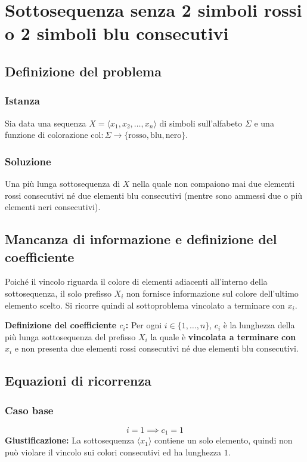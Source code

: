\chapter{Sottosequenza senza 2 simboli rossi o 2 simboli blu consecutivi}

\section{Definizione del problema}

\subsection{Istanza}
Sia data una sequenza $X = \langle x_1, x_2, \dots, x_n \rangle$ di simboli sull'alfabeto $\Sigma$ e una funzione di colorazione $\text{col} : \Sigma \to \{\text{rosso}, \text{blu}, \text{nero}\}$.

\subsection{Soluzione}
Una più lunga sottosequenza di $X$ nella quale non compaiono mai due elementi rossi consecutivi né due elementi blu consecutivi (mentre sono ammessi due o più elementi neri consecutivi).

\section{Mancanza di informazione e definizione del coefficiente}
Poiché il vincolo riguarda il colore di elementi adiacenti all'interno della sottosequenza, il solo prefisso $X_i$ non fornisce informazione sul colore dell'ultimo elemento scelto. Si ricorre quindi al sottoproblema vincolato a terminare con $x_i$.

\medskip
\noindent
\textbf{Definizione del coefficiente $c_i$:} Per ogni $i \in \{1, \dots, n\}$, $c_i$ è la lunghezza della più lunga sottosequenza del prefisso $X_i$ la quale è \textbf{vincolata a terminare con $x_i$} e non presenta due elementi rossi consecutivi né due elementi blu consecutivi.

\section{Equazioni di ricorrenza}

\subsection{Caso base}
\[
    i = 1 \implies c_1 = 1
\]
\textbf{Giustificazione:} La sottosequenza $\langle x_1 \rangle$ contiene un solo elemento, quindi non può violare il vincolo sui colori consecutivi ed ha lunghezza $1$.

